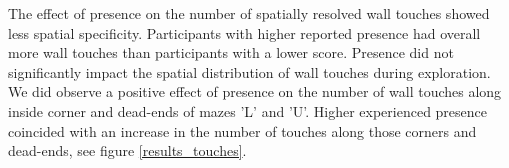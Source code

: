 The effect of presence on the number of spatially resolved wall touches showed less spatial specificity. Participants with higher reported presence had overall more wall touches than participants with a lower score. Presence did not significantly impact the spatial distribution of wall touches during exploration. We did observe a positive effect of presence on the number of wall touches along inside corner and dead-ends of mazes 'L' and 'U'. Higher experienced presence coincided with an increase in the number of touches along those corners and dead-ends, see figure \ref{results_touches}.